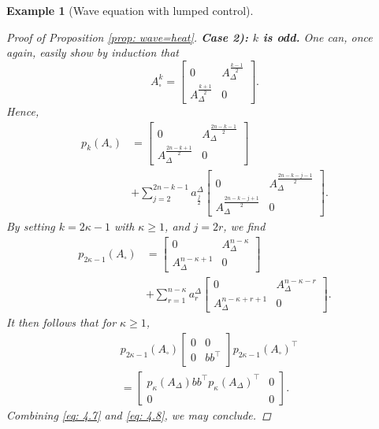 \documentclass[journal,twoside,web]{ieeecolor}
\newtheorem{example}{Example}
\begin{document}
\begin{example}[Wave equation with lumped control]
\begin{proof}[Proof of Proposition \ref{prop: wave=heat}]
	\smallskip
	
	\noindent
	\textbf{Case 2): $k$ is odd.} One can, once again, easily show by induction that
	\begin{equation*}
	A_\square^k = \begin{bmatrix} 0 & A_\Delta^{\frac{k-1}{2}} \\
	A_\Delta^{\frac{k+1}{2}} & 0 \end{bmatrix}.
	\end{equation*}
	Hence, 
	\begin{align*}
	p_k(A_\square) &= \begin{bmatrix} 0 & A_\Delta^{\frac{2n-k-1}{2}} \\
	A_\Delta^{\frac{2n-k+1}{2}} & 0 \end{bmatrix}\\
	& + \sum_{j=2}^{2n-k-1} a_{\frac{j}{2}}^\Delta \begin{bmatrix} 0 & A_\Delta^{\frac{2n-k-j-1}{2}} \\
	A_\Delta^{\frac{2n-k-j+1}{2}} & 0 \end{bmatrix}.
	\end{align*}
	By setting $k=2\kappa-1$ with $\kappa\geqslant1$, and $j=2r$, we find 
	\begin{align*}
	p_{2\kappa-1}(A_\square) &=  \begin{bmatrix} 0 & A_\Delta^{n-\kappa} \\
	A_\Delta^{n-\kappa+1} & 0 \end{bmatrix} \\
	&+ \sum_{r=1}^{n-\kappa} a_r^\Delta \begin{bmatrix} 0 & A_\Delta^{n-\kappa-r} \\
	A_\Delta^{n-\kappa+r+1} & 0 \end{bmatrix}.
	\end{align*}
	It then follows that for $\kappa\geqslant1$, 
	\begin{align} \label{eq: 4.8}
	&p_{2\kappa-1}(A_\square)\begin{bmatrix} 0 & 0\\
	0 & bb^\top\end{bmatrix} p_{2\kappa-1}(A_{\square})^\top \nonumber \\
	&=  \begin{bmatrix}p_{\kappa}(A_\Delta) bb^\top p_{\kappa}(A_\Delta)^\top & 0 \\ 0 & 0\end{bmatrix}.
	\end{align}
	Combining \eqref{eq: 4.7} and \eqref{eq: 4.8}, we may conclude.
	\end{proof}


\end{example}
\end{document}
